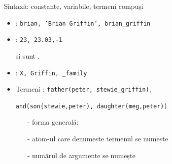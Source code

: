\documentclass[xcolor=pdftex,romanian,colorlinks]{beamer}
\begin{document}
\begin{frame}{Sintaxă: constante, variabile, termeni compuși}

\bigskip

\begin{itemize}
	
		
		  \item {}: \texttt{brian, 'Brian Griffin', 
		  brian\_griffin}
		  \bigskip
		  \item {}: \texttt{23, 23.03,-1}
		
		\medskip
		
		 și  sunt .
		\medskip
		\item {}: \texttt{X, Griffin, \_family}

		\bigskip
			\item Termeni : \texttt{father(peter, stewie\_griffin)},
			
\hspace*{1cm}\texttt{and(son(stewie,peter), daughter(meg,peter))}

\begin{itemize}
\item[-]   forma generală:	
 \item[-]  atom-ul care denumește termenul se numește 		      	
			      	
\item[-] numărul de argumente se numește 			      	\end{itemize}
\end{itemize}

\end{frame}
\end{document}
